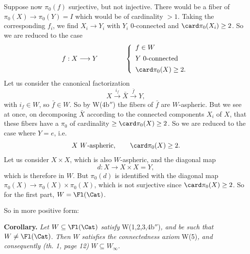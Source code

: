 Suppose now $\pi_0(f)$ surjective, but not injective. There would be a fiber of $\pi_0(X) \longrightarrow \pi_0(Y) = I$ which would be of cardinality $> 1$. Taking the corresponding $f_i$, we find $X_i \longrightarrow Y_i$ with $Y_i$ 0-connected and $\card \pi_0(X_i) \geq 2$. So we are reduced to the case
\[
f : X \longrightarrow Y \qquad\qquad \left\{
\begin{array}{l}
f \in W \\[1ex]
Y \text{ 0-connected} \\[1ex]
\card \pi_0(X) \geq 2.
\end{array}
\right.
\]
Let us consider the canonical factorization
\[
X \xrightarrow{i_f} \bar{X} \xrightarrow{\bar{f}} Y,
\]
with $i_f \in W$, so $\bar{f} \in W$. So by W(4b$''$) the fibers of $\bar{f}$ are $W$-aspheric. But we see at once, on decomposing $\bar{X}$ according to the connected components $X_i$ of $X$, that these fibers have a $\pi_0$ of cardinality $\geq \card \pi_0(X) \geq 2$. So we are reduced to the case where $Y = e$, i.e.
\[
X \ W\text{-aspheric}, \qquad \card \pi_0(X) \geq 2.
\]
Let us consider $X \times X$, which is also $W$-aspheric, and the diagonal map
\[
d : X \longrightarrow X \times X = Y,
\]
which is therefore in $W$. But $\pi_0(d)$ is identified with the diagonal map $\pi_0(X) \longrightarrow \pi_0(X) \times \pi_0(X)$, which is not surjective since $\card \pi_0(X) \geq 2$. So for the first part, $W = \Fl(\Cat)$.

So in more positive form:

\textbf{Corollary.} \textit{Let} $W \subseteq \Fl(\Cat)$ \textit{satisfy} W(1,2,3,4b$''$)\textit{, and be such that} $W \neq \Fl(\Cat)$. \textit{Then $W$ satisfies the connectedness axiom} W(5)\textit{, and consequently (th. 1, page 12)} $W \subseteq W_\infty$.